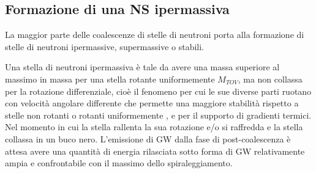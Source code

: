 \subsection{Formazione di una NS ipermassiva}
\label{subsection:ipermassiva}	
La maggior parte delle coalescenze di stelle di neutroni porta alla formazione di stelle di neutroni ipermassive, supermassive o stabili. 

Una stella di neutroni ipermassiva è tale da avere una massa superiore al massimo in massa per una stella rotante uniformemente $M_{TOV}$, ma non collassa per la rotazione differenziale, cioè il fenomeno per cui le sue diverse parti ruotano con velocità angolare differente che permette una maggiore stabilità rispetto a stelle non rotanti o rotanti uniformemente \cite{Baumgarte_2000}, e per il supporto di gradienti termici.
%
Nel momento in cui la stella rallenta la sua rotazione e/o si raffredda e la stella collassa in un buco nero. 
%
%
%
L'emissione di GW dalla fase di post-coalescenza è attesa avere una quantità di energia rilasciata sotto forma di GW relativamente ampia e confrontabile con il massimo dello spiraleggiamento\cite{sarin2020evolution}. 

